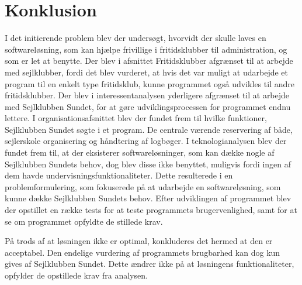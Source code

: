 \chapter{Konklusion} 
I det initierende problem blev der undersøgt, hvorvidt der skulle laves en softwareløsning, som kan hjælpe frivillige i fritidsklubber til administration, og som er let at benytte. 
Der blev i afsnittet Fritidsklubber afgrænset til at arbejde med sejlklubber, fordi det blev vurderet, at hvis det var muligt at udarbejde et program til en enkelt type fritidsklub, kunne programmet også udvikles til andre fritidsklubber. 
Der blev i interessentanalysen yderligere afgrænset til at arbejde med Sejlklubben Sundet, for at gøre udviklingsprocessen for programmet endnu lettere.
I organisationsafsnittet blev der fundet frem til hvilke funktioner, Sejlklubben Sundet søgte i et program.
De centrale værende reservering af både, sejlerskole organisering og håndtering af logbøger.
I teknologianalysen blev der fundet frem til, at der eksisterer softwareløsninger, som kan dække nogle af Sejlklubben Sundets behov, dog blev disse ikke benyttet, muligvis fordi ingen af dem havde undervisningsfunktionaliteter. 
Dette resulterede i en problemformulering, som fokuserede på at udarbejde en softwareløsning, som kunne dække Sejlklubben Sundets behov. 
Efter udviklingen af programmet blev der opstillet en række tests for at teste programmets brugervenlighed, samt for at se om programmet opfyldte de stillede krav.

På trods af at løsningen ikke er optimal, konkluderes det hermed at den er acceptabel. 
Den endelige vurdering af programmets brugbarhed kan dog kun gives af Sejlklubben Sundet.
Dette ændrer ikke på at løsningens funktionaliteter, opfylder de opstillede krav fra analysen. 

